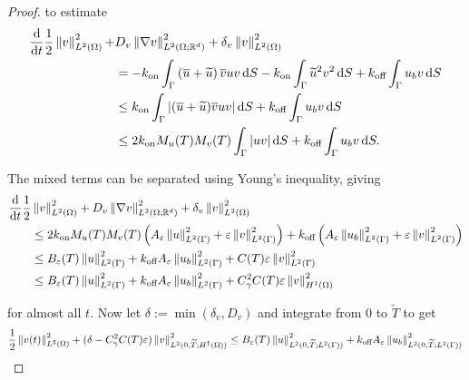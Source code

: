 \begin{proof}
    \noindent
    to estimate
%
    \begin{equation*}
    \begin{aligned}
        \frac{\d}{\d t} \frac{1}{2} \norm{v}_{\Ltwo{\Omega}}^2 + &D_v \norm{\nabla v}_{\Ltwo{\Omega; \R^d}}^2 + \delta_v \norm{v}_{\Ltwo{\Omega}}^2 \\
        &= - \kon \int_\Gamma \left(\ub + \ut\right) \vb u v \d S - \kon \int_\Gamma \ut^2 v^2 \d S + \koff \int_\Gamma u_b v \d S \\
        &\leq \kon \int_\Gamma \left|(\ub + \ut) \vb u v\right| \d S + \koff \int_\Gamma u_b v \d S \\
        &\leq 2 \kon M_{u}(T) M_v(T) \int_\Gamma \left|u v\right| \d S + \koff \int_\Gamma u_b v \d S .\\
    \end{aligned}
    \end{equation*}

    \noindent
    The mixed terms can be separated using Young's inequality, giving
%
    \begingroup
    \allowdisplaybreaks
    \begin{align*}
        \frac{\mathop{}\!\mathrm{d}}{\mathop{}\!\mathrm{d} t} \frac{1}{2} &\left\| v \right\|_{L^2(\Omega)}^2 + D_v \left\| \nabla v \right\|_{L^2(\Omega; \mathbb{R}^d)}^2 + \delta_v \left\| v \right\|_{L^2(\Omega)}^2 \\
        &\leq 2 k_\text{on} M_{u}(T) M_v(T) \left(A_{\varepsilon} \left\| u \right\|_{L^2(\Gamma)}^2 + \varepsilon \left\| v \right\|_{L^2(\Gamma)}^2\right) + k_\text{off} \left(A_{\varepsilon} \left\| u_b \right\|_{L^2(\Gamma)}^2 + \varepsilon \left\| v \right\|_{L^2(\Gamma)}^2\right) \\
        &\leq B_\varepsilon(T) \left\| u \right\|_{L^2(\Gamma)}^2 + k_\text{off} A_{\varepsilon} \left\| u_b \right\|_{L^2(\Gamma)}^2 + C(T) \varepsilon \left\| v \right\|_{L^2(\Gamma)}^2 \\
        &\leq B_\varepsilon(T) \left\| u \right\|_{L^2(\Gamma)}^2 + k_\text{off} A_{\varepsilon} \left\| u_b \right\|_{L^2(\Gamma)}^2 + C_\gamma^2 C(T) \varepsilon \left\| v \right\|_{H^1(\Omega)}^2\\
    \end{align*}
    \endgroup

    \noindent
    for almost all $t$. Now let $\delta := \min (\delta_v, D_v)$ and integrate from 0 to $\widetilde{T}$ to get
%
    \begin{equation*}
        \frac{1}{2} \left\| v(t) \right\|_{L^2(\Omega)}^2 + (\delta - C_\gamma^2 C(T) \varepsilon) \left\| v \right\|_{L^2(0, \widetilde{T}; H^1(\Omega))}^2 \leq B_\varepsilon(T) \left\| u \right\|_{L^2(0, \widetilde{T}; L^2(\Gamma))}^2 + k_\text{off} A_{\varepsilon} \left\| u_b \right\|_{L^2(0, \widetilde{T}; L^2(\Gamma))}^2
    \end{equation*}


\end{proof}
